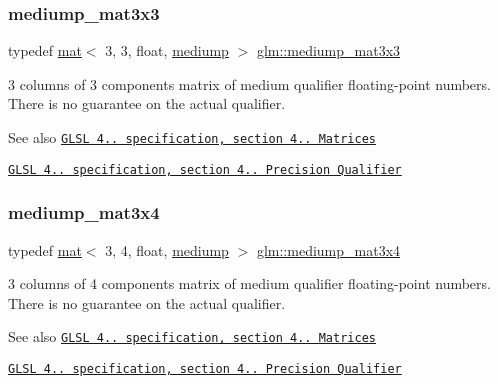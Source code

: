 \subsubsection{\texorpdfstring{mediump\+\_\+mat3x3}{mediump\_mat3x3}}
{\footnotesize\ttfamily typedef \mbox{\hyperlink{structglm_1_1mat}{mat}}$<$ 3, 3, float, \mbox{\hyperlink{namespaceglm_a36ed105b07c7746804d7fdc7cc90ff25a6416f3ea0c9025fb21ed50c4d6620482}{mediump}} $>$ \mbox{\hyperlink{group__core__precision_ga774bbcb2f667fc0a91add50e55d8ac04}{glm\+::mediump\+\_\+mat3x3}}}

3 columns of 3 components matrix of medium qualifier floating-\/point numbers. There is no guarantee on the actual qualifier.

\begin{DoxySeeAlso}{See also}
\href{http://www.opengl.org/registry/doc/GLSLangSpec.4.20.8.pdf}{\tt G\+L\+SL 4.. specification, section 4.. Matrices} 

\href{http://www.opengl.org/registry/doc/GLSLangSpec.4.20.8.pdf}{\tt G\+L\+SL 4.. specification, section 4.. Precision Qualifier} 
\end{DoxySeeAlso}
\mbox{\label{group__core__precision_ga61dd8c2c7fd60c1343a6b3aca7f86c25}} 
\subsubsection{\texorpdfstring{mediump\+\_\+mat3x4}{mediump\_mat3x4}}
{\footnotesize\ttfamily typedef \mbox{\hyperlink{structglm_1_1mat}{mat}}$<$ 3, 4, float, \mbox{\hyperlink{namespaceglm_a36ed105b07c7746804d7fdc7cc90ff25a6416f3ea0c9025fb21ed50c4d6620482}{mediump}} $>$ \mbox{\hyperlink{group__core__precision_ga61dd8c2c7fd60c1343a6b3aca7f86c25}{glm\+::mediump\+\_\+mat3x4}}}

3 columns of 4 components matrix of medium qualifier floating-\/point numbers. There is no guarantee on the actual qualifier.

\begin{DoxySeeAlso}{See also}
\href{http://www.opengl.org/registry/doc/GLSLangSpec.4.20.8.pdf}{\tt G\+L\+SL 4.. specification, section 4.. Matrices} 

\href{http://www.opengl.org/registry/doc/GLSLangSpec.4.20.8.pdf}{\tt G\+L\+SL 4.. specification, section 4.. Precision Qualifier} 
\end{DoxySeeAlso}
\mbox{\label{group__core__precision_ga0987ea03f27d035ebd79fd71ca394be1}} 
